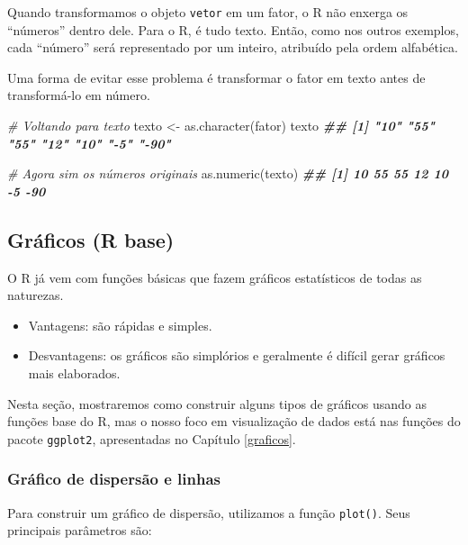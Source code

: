 \documentclass[
]{book}
\newenvironment{Shaded}{\begin{snugshade}}{\end{snugshade}}
\newcommand{\CommentTok}[1]{\textcolor[rgb]{0.56,0.35,0.01}{\textit{#1}}}
\newcommand{\DocumentationTok}[1]{\textcolor[rgb]{0.56,0.35,0.01}{\textbf{\textit{#1}}}}
\newcommand{\FunctionTok}[1]{\textcolor[rgb]{0.00,0.00,0.00}{#1}}
\newcommand{\NormalTok}[1]{#1}
\newcommand{\OtherTok}[1]{\textcolor[rgb]{0.56,0.35,0.01}{#1}}
\providecommand{\tightlist}{%
  \setlength{\itemsep}{0pt}\setlength{\parskip}{0pt}}
\begin{document}
Quando transformamos o objeto \texttt{vetor} em um fator, o R não enxerga os ``números'' dentro dele. Para o R, é tudo texto. Então, como nos outros exemplos, cada ``número'' será representado por um inteiro, atribuído pela ordem alfabética.

Uma forma de evitar esse problema é transformar o fator em texto antes de transformá-lo em número.

\begin{Shaded}
\begin{Highlighting}[]
\CommentTok{\# Voltando para texto}
\NormalTok{texto }\OtherTok{\textless{}{-}} \FunctionTok{as.character}\NormalTok{(fator)}
\NormalTok{texto}
\DocumentationTok{\#\# [1] "10"  "55"  "55"  "12"  "10"  "{-}5"  "{-}90"}

\CommentTok{\# Agora sim os números originais}
\FunctionTok{as.numeric}\NormalTok{(texto)}
\DocumentationTok{\#\# [1]  10  55  55  12  10  {-}5 {-}90}
\end{Highlighting}
\end{Shaded}

\hypertarget{gruxe1ficos-r-base}{%
\subsection{Gráficos (R base)}\label{gruxe1ficos-r-base}}

O R já vem com funções básicas que fazem gráficos estatísticos de todas as naturezas.

\begin{itemize}
\tightlist
\item
  Vantagens: são rápidas e simples.
\item
  Desvantagens: os gráficos são simplórios e geralmente é difícil gerar gráficos mais elaborados.
\end{itemize}

Nesta seção, mostraremos como construir alguns tipos de gráficos usando as funções base do R, mas o nosso foco em visualização de dados está nas funções do pacote \texttt{ggplot2}, apresentadas no Capítulo \ref{graficos}.

\hypertarget{gruxe1fico-de-dispersuxe3o-e-linhas}{%
\subsubsection*{Gráfico de dispersão e linhas}\label{gruxe1fico-de-dispersuxe3o-e-linhas}}

Para construir um gráfico de dispersão, utilizamos a função \texttt{plot()}. Seus principais parâmetros são:
\end{document}
